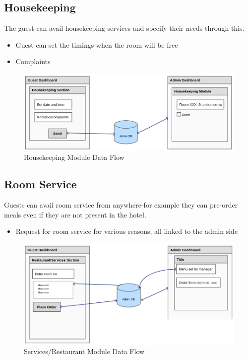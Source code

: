 \documentclass{scrreprt}
\begin{document}
\subsection{Housekeeping}
The guest can avail housekeeping services and specify their needs through this.
\begin{itemize}
    \item Guest can set the timings when the room will be free
    \item Complaints
\end{itemize}
\begin{figure}
\includegraphics[scale=0.45]{housekeeping}
\caption{Housekeeping Module Data Flow}
\end{figure}

\subsection{Room Service}
Guests can avail room service from anywhere-for example they can pre-order meals even if they are not present in the hotel.
\begin{itemize}
\item Request for room service for various reasons, all linked to the admin side
\end{itemize}
\begin{figure}
\includegraphics[scale=0.45]{food}
\caption{Services/Restaurant Module Data Flow}
\end{figure}
\end{document}
